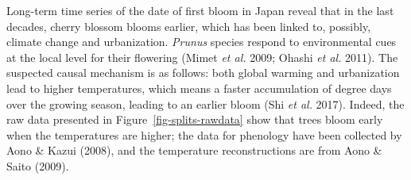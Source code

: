 \documentclass[
  letterpaper,
]{scrbook}
\begin{document}
Long-term time series of the date of first bloom in Japan reveal that in
the last decades, cherry blossom blooms earlier, which has been linked
to, possibly, climate change and urbanization. \emph{Prunus} species
respond to environmental cues at the local level for their flowering
(Mimet \emph{et al.} 2009; Ohashi \emph{et al.} 2011). The suspected
causal mechanism is as follows: both global warming and urbanization
lead to higher temperatures, which means a faster accumulation of degree
days over the growing season, leading to an earlier bloom (Shi \emph{et
al.} 2017). Indeed, the raw data presented in
Figure~\ref{fig-splits-rawdata} show that trees bloom early when the
temperatures are higher; the data for phenology have been collected by
Aono \& Kazui (2008), and the temperature reconstructions are from Aono
\& Saito (2009).

{
\makeatletter
\def\LT@makecaption#1#2#3{%
  \noalign{\smash{\hbox{\kern\textwidth\rlap{\kern\marginparsep
  \parbox[t]{\marginparwidth}{%
    \footnotesize{%
      \vspace{(1.1\baselineskip)}
    #1{#2: }\ignorespaces #3}}}}}}%
    }
\makeatother

\begin{figure}[bt]



\end{figure}%

}
\end{document}
